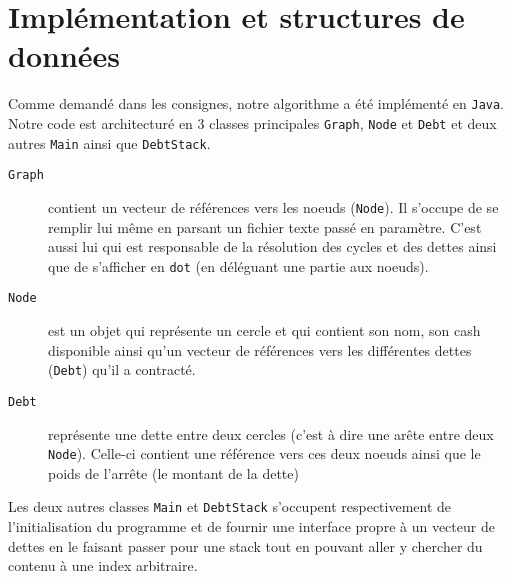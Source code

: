 \documentclass[12pt, oneside]{article}
\begin{document}
\section{Implémentation et structures de données}
Comme demandé dans les consignes, notre algorithme a été implémenté en \texttt{Java}. Notre code est architecturé en 3 classes principales \texttt{Graph}, \texttt{Node} et \texttt{Debt} et deux autres \texttt{Main} ainsi que \texttt{DebtStack}.
\begin{description}
\item[\texttt{Graph}] contient un vecteur de références vers les noeuds (\texttt{Node}). Il s'occupe de se remplir lui même en parsant un fichier texte passé en paramètre. C'est aussi lui qui est responsable de la résolution des cycles et des dettes ainsi que de s'afficher en \texttt{dot} (en déléguant une partie aux noeuds).
\item[\texttt{Node}] est un objet qui représente un cercle et qui contient son nom, son cash disponible ainsi qu'un vecteur de références vers les différentes dettes
(\texttt{Debt}) qu'il a contracté.
\item[\texttt{Debt}] représente une dette entre deux cercles (c'est à dire une arête entre deux \texttt{Node}). Celle-ci contient une référence vers ces deux noeuds ainsi que le poids de l'arrête (le montant de la dette)
\end{description}
Les deux autres classes \texttt{Main} et \texttt{DebtStack} s'occupent respectivement de l'initialisation du programme et de fournir une interface propre à un vecteur de dettes en le faisant passer pour une stack tout en pouvant aller y chercher du contenu à une index arbitraire.
\end{document}
